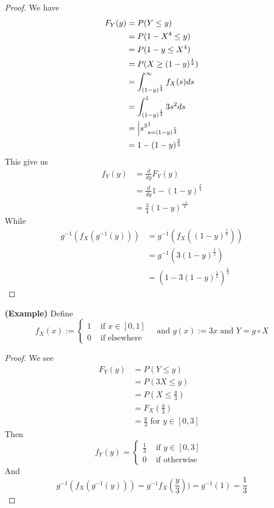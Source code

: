 \documentclass{report}
\begin{document}
\begin{proof}
We have
\begin{align}
F_Y(y)&=P(Y\leq y)\\
&=P(1-X^4\leq y)\\
&=P(1-y\leq X^4)\\
&=P(X\geq (1-y)^{\frac{1}{4}})\\
&=\int_{(1-y)^{\frac{1}{4}}}^\infty f_X(s)ds\\
&=\int_{(1-y)^{\frac{1}{4}}}^1 3s^2ds\\
&= \Big|{s^3}_{s=(1-y)^{\frac{1}{4}}}^1\\
&=1-(1-y)^{\frac{3}{4}}
\end{align}
This give us
\begin{align}
f_Y(y)&=\frac{d}{dy}F_Y(y)\\
&=\frac{d}{dy}1-(1-y)^{\frac{3}{4}}\\
&=\frac{3}{4}(1-y)^{\frac{-1}{4}}
\end{align}
While 
\begin{align}
g^{-1}(f_X(g^{-1}(y)))&= g^{-1}(f_X((1-y)^{\frac{1}{4}}))\\
&=g^{-1}(3(1-y)^{\frac{1}{2}})\\
&=(1-3(1-y)^{\frac{1}{2}})^{\frac{1}{4}}
\end{align}

\end{proof}
\begin{theorem}
\label{2.0.12}
\textbf{(Example)} Define 
\begin{equation}
f_X(x):=\begin{cases}
  1& \text{ if $x\in [0,1]$ }\\
  0& \text{ if elsewhere }
\end{cases}\text{ and }g(x):=3x\text{ and }Y=g\circ X
\end{equation}
\end{theorem}
\begin{proof}
We see 
\begin{align}
F_Y(y)&=P(Y\leq y)\\
&=P(3X\leq y)\\
&=P(X\leq \frac{y}{3})\\
&=F_X(\frac{y}{3})\\
&=\frac{y}{3}\text{ for $y\in [0,3]$ }
\end{align}
Then 
\begin{equation}
f_Y(y)=\begin{cases}
  \frac{1}{3}& \text{ if $y\in [0,3]$ }\\
  0& \text{ if otherwise }
\end{cases}
\end{equation}
And
\begin{equation}
g^{-1}(f_X(g^{-1}(y)))=g^{-1}f_X(\frac{y}{3}))=g^{-1}(1)=\frac{1}{3}
\end{equation}
\end{proof}
\end{document}
